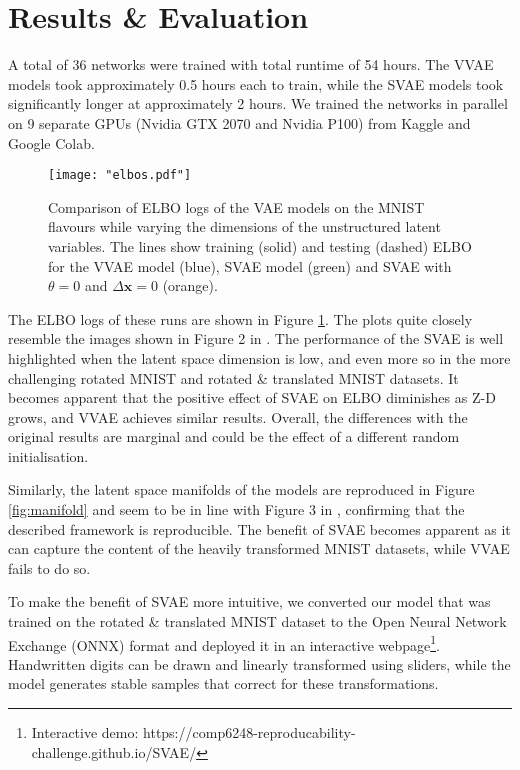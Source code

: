 \section{Results \& Evaluation} \label{resultsandeval}
A total of 36 networks were trained with total runtime of 54 hours. The VVAE models took approximately 0.5 hours each to train, while the SVAE models took significantly longer at approximately 2 hours. We trained the networks in parallel on 9 separate GPUs (Nvidia GTX 2070 and Nvidia P100) from Kaggle and Google Colab. %

\begin{figure}[t]
    \begin{center}
        \texttt{[image: "elbos.pdf"]}
    \end{center}
    \caption{Comparison of ELBO logs of the VAE models on the MNIST flavours while varying the dimensions of the unstructured latent variables. The lines show training (solid) and testing (dashed) ELBO for the VVAE model (blue), SVAE model (green) and SVAE with $\theta=0$ and $\Delta \textbf{x}=0$ (orange).}
    \label{fig:elbo}
\end{figure}

The ELBO logs of these runs are shown in Figure \ref{fig:elbo}. The plots quite closely resemble the images shown in Figure 2 in \cite{bepler2019spatialvae}. The performance of the SVAE is well highlighted when the latent space dimension is low, and even more so in the more challenging rotated MNIST and rotated & translated MNIST datasets. It becomes apparent that the positive effect of SVAE on ELBO diminishes as Z-D grows, and VVAE achieves similar results. Overall, the differences with the original results are marginal and could be the effect of a different random initialisation. 

Similarly, the latent space manifolds of the models are reproduced in Figure \ref{fig:manifold} and seem to be in line with Figure 3 in \cite{bepler2019spatialvae}, confirming that the described framework is reproducible. The benefit of SVAE becomes apparent as it can capture the content of the heavily transformed MNIST datasets, while VVAE fails to do so.

To make the benefit of SVAE more intuitive, we converted our model that was trained on the rotated \& translated MNIST dataset to the Open Neural Network Exchange (ONNX) format and deployed it in an interactive webpage\footnote{Interactive demo: https://comp6248-reproducability-challenge.github.io/SVAE/}. Handwritten digits can be drawn and linearly transformed using sliders, while the model generates stable samples that correct for these transformations.

